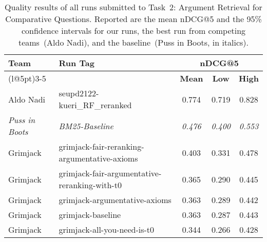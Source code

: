 \begin{table}[t]
\centering
\footnotesize
\renewcommand{\tabcolsep}{5pt}
\caption{Quality results of all runs submitted to Task~2: Argument Retrieval for Comparative Questions. Reported are the mean nDCG@5 and the 95\% confidence intervals for our runs, the best run from competing teams~(Aldo Nadi), and the baseline~(Puss in Boots, in italics).}
\label{table-results-quality}
\begin{tabular}{@{}llccc@{}}
\toprule
\textbf{Team} & \textbf{Run Tag} & \multicolumn{3}{c}{\textbf{nDCG@5}} \\
\cmidrule(l@{\tabcolsep}){3-5}
&  & \textbf{Mean} & \textbf{Low} & \textbf{High} \\
\midrule
Aldo Nadi~\cite{AbaAGMPVF2022} & seupd2122-kueri\_RF\_reranked & 0.774 & 0.719 & 0.828 \\
\textit{Puss in Boots}~\cite{BondarenkoFKSGBPBSWPH2022} & \textit{BM25-Baseline} & \textit{0.476} & \textit{0.400} & \textit{0.553} \\
Grimjack & grimjack-fair-reranking-argumentative-axioms & 0.403 & 0.331 & 0.478 \\
Grimjack & grimjack-fair-argumentative-reranking-with-t0 & 0.365 & 0.290 & 0.445 \\
Grimjack & grimjack-argumentative-axioms & 0.363 & 0.289 & 0.442 \\
Grimjack & grimjack-baseline & 0.363 & 0.287 & 0.443 \\
Grimjack & grimjack-all-you-need-is-t0 & 0.344 & 0.266 & 0.428 \\
\bottomrule
\end{tabular}
\end{table}
